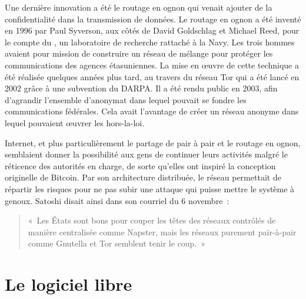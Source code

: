 Une dernière innovation a été le routage en ognon qui venait ajouter de la confidentialité dans la transmission de données. Le routage en ognon a été inventé en 1996 par Paul Syverson, aux côtés de David Goldschlag et Michael Reed, pour le compte du , un laboratoire de recherche rattaché à la Navy. Les trois hommes avaient pour mission de construire un réseau de mélange pour protéger les communications des agences étasuniennes. La mise en œuvre de cette technique a été réalisée quelques années plus tard, au travers du réseau Tor qui a été lancé en 2002 grâce à une subvention du DARPA. Il a été rendu public en 2003, afin d'agrandir l'ensemble d'anonymat dans lequel pouvait se fondre les communications fédérales. Cela avait l'avantage de créer un réseau anonyme dans lequel pouvaient œuvrer les hors-la-loi.

Internet, et plus particulièrement le partage de pair à pair et le routage en ognon, semblaient donner la possibilité aux gens de continuer leurs activités malgré le réticence des autorités en charge, de sorte qu'elles ont inspiré la conception originelle de Bitcoin. Par son architecture distribuée, le réseau permettait de répartir les risques pour ne pas subir une attaque qui puisse mettre le système à genoux. Satoshi disait ainsi dans son courriel du 6 novembre~:

\begin{quote}
«~Les États sont bons pour couper les têtes des réseaux contrôlés de manière centralisée comme Napster, mais les réseaux purement pair-à-pair comme Gnutella et Tor semblent tenir le coup.~»
\end{quote} %


\section*{Le logiciel libre} %

